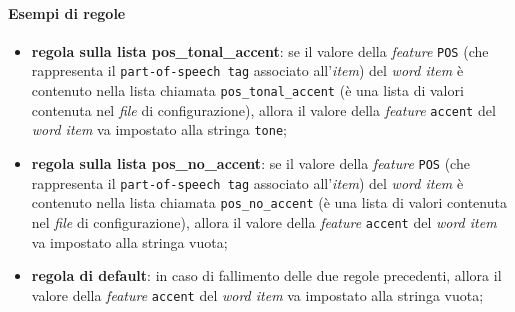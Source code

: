                 \paragraph{Esempi di regole}
                  \begin{itemize}
                    \item \textbf{regola sulla lista pos\_tonal\_accent}: se il valore della \textit{feature} 
                                                                          \texttt{POS} (che rappresenta il \texttt{part-of-speech tag} 
                                                                          associato all'\textit{item}) del \textit{word item} 
                                                                          è contenuto nella lista chiamata \texttt{pos\_tonal\_accent}
                                                                          (è una lista di valori contenuta nel \textit{file} di configurazione),
                                                                          allora il valore della \textit{feature} \texttt{accent} del \textit{word item}
                                                                          va impostato alla stringa \texttt{tone};
                    \item \textbf{regola sulla lista pos\_no\_accent}:    se il valore della \textit{feature} 
                                                                          \texttt{POS} (che rappresenta il \texttt{part-of-speech tag} 
                                                                          associato all'\textit{item}) del \textit{word item} 
                                                                          è contenuto nella lista chiamata \texttt{pos\_no\_accent}
                                                                          (è una lista di valori contenuta nel \textit{file} di configurazione),
                                                                          allora il valore della \textit{feature} \texttt{accent} del \textit{word item}
                                                                          va impostato alla stringa vuota;
                    \item \textbf{regola di default}:                     in caso di fallimento delle due regole precedenti,
                                                                          allora il valore della \textit{feature} \texttt{accent} del \textit{word item}
                                                                          va impostato alla stringa vuota;

\end{itemize}
